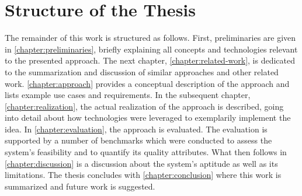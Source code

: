 \section{Structure of the Thesis}
The remainder of this work is structured as follows. First, preliminaries are given in \autoref{chapter:preliminaries}, briefly explaining all concepts and technologies relevant to the presented approach. The next chapter, \autoref{chapter:related-work}, is dedicated to the summarization and discussion of similar approaches and other related work. \autoref{chapter:approach} provides a conceptual description of the approach and lists example use cases and requirements. In the subsequent chapter, \autoref{chapter:realization}, the actual realization of the approach is described, going into detail about how technologies were leveraged to exemplarily implement the idea. In \autoref{chapter:evaluation}, the approach is evaluated. The evaluation is supported by a number of benchmarks which were conducted to assess the system's feasibility and to quantify its quality attributes. What then follows in \autoref{chapter:discussion} is a discussion about the system's aptitude as well as its limitations. The thesis concludes with \autoref{chapter:conclusion} where this work is summarized and future work is suggested.

%
%
%
%
%
%
%
%
%
%
%
%
%
%
%
%
%
%
%
%
%
%
%
%
%
%
%
%
%
%
%
%
%
%
%
%
%
%
